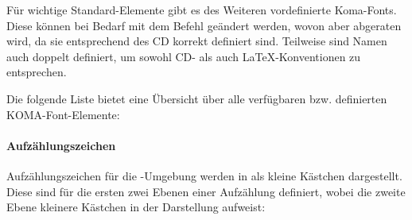 Für wichtige Standard-Elemente gibt es des Weiteren vordefinierte Koma-Fonts.
Diese können bei Bedarf mit dem Befehl  
geändert werden, wovon aber abgeraten wird, da sie entsprechend des CD korrekt
definiert sind. Teilweise sind Namen auch doppelt definiert, um sowohl
CD- als auch \LaTeX-Konventionen zu entsprechen.

Die folgende Liste bietet eine Übersicht über alle verfügbaren bzw.
definierten KOMA-Font-Elemente:

\begin{desctable}
\end{desctable}


\paragraph{Aufzählungszeichen}

Aufzählungszeichen für die -Umgebung werden in \tubslatex
als kleine Kästchen dargestellt.
Diese sind für die ersten zwei Ebenen einer Aufzählung definiert, wobei
die zweite Ebene kleinere Kästchen in der Darstellung aufweist:
\begin{center}
\end{center}



